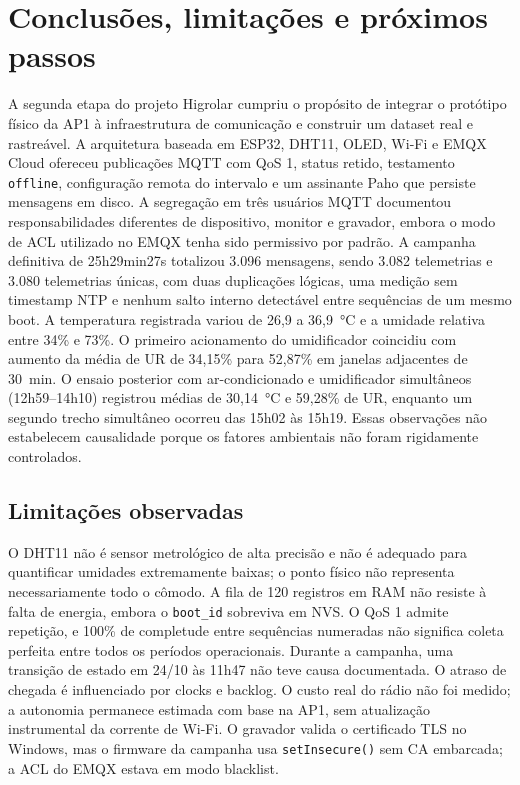 \chapter{Conclusões, limitações e próximos passos}\label{cap:conclusao}
\rubricaComunicacao
A segunda etapa do projeto Higrolar cumpriu o propósito de integrar o protótipo físico da AP1 à infraestrutura de comunicação e construir um dataset real e rastreável. A arquitetura baseada em ESP32, DHT11, OLED, Wi-Fi e EMQX Cloud ofereceu publicações MQTT com QoS 1, status retido, testamento \texttt{offline}, configuração remota do intervalo e um assinante Paho que persiste mensagens em disco. A segregação em três usuários MQTT documentou responsabilidades diferentes de dispositivo, monitor e gravador, embora o modo de ACL utilizado no EMQX tenha sido permissivo por padrão.
A campanha definitiva de 25h29min27s totalizou 3.096 mensagens, sendo 3.082 telemetrias e 3.080 telemetrias únicas, com duas duplicações lógicas, uma medição sem timestamp NTP e nenhum salto interno detectável entre sequências de um mesmo boot. A temperatura registrada variou de 26,9 a 36,9~\si{\celsius} e a umidade relativa entre 34\% e 73\%. O primeiro acionamento do umidificador coincidiu com aumento da média de UR de 34,15\% para 52,87\% em janelas adjacentes de 30~min. O ensaio posterior com ar-condicionado e umidificador simultâneos (12h59--14h10) registrou médias de 30,14~\si{\celsius} e 59,28\% de UR, enquanto um segundo trecho simultâneo ocorreu das 15h02 às 15h19. Essas observações não estabelecem causalidade porque os fatores ambientais não foram rigidamente controlados.
\section{Limitações observadas}
O DHT11 não é sensor metrológico de alta precisão e não é adequado para quantificar umidades extremamente baixas; o ponto físico não representa necessariamente todo o cômodo. A fila de 120 registros em RAM não resiste à falta de energia, embora o \texttt{boot\_id} sobreviva em NVS. O QoS 1 admite repetição, e 100\% de completude entre sequências numeradas não significa coleta perfeita entre todos os períodos operacionais. Durante a campanha, uma transição de estado em 24/10 às 11h47 não teve causa documentada. O atraso de chegada é influenciado por clocks e backlog. O custo real do rádio não foi medido; a autonomia permanece estimada com base na AP1, sem atualização instrumental da corrente de Wi-Fi. O gravador valida o certificado TLS no Windows, mas o firmware da campanha usa \texttt{setInsecure()} sem CA embarcada; a ACL do EMQX estava em modo blacklist.
